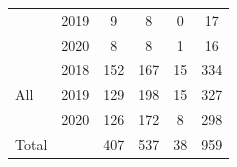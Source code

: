 \begin{tabular}{llcccc}
& 2019      &           9&           8&           0&          17\\
& 2020      &           8&           8&           1&          16\\
\hline \multirow{3}{*}{All} & 2018&         152&         167&          15&         334\\
& 2019      &         129&         198&          15&         327\\
& 2020      &         126&         172&           8&         298\\
\hline Total &&         407&         537&          38&         959\\
\hline \end{tabular}
